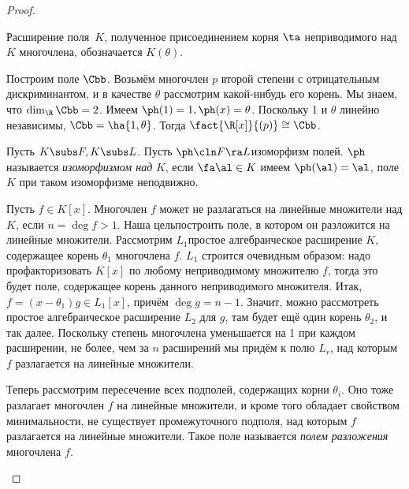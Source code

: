 \documentclass[a4paper]{article}
\begin{document}
\begin{proof}
\begin{note}
Расширение поля~$K$, полученное присоединением корня $\ta$ неприводимого над $K$ многочлена, обозначается
$K(\theta)$.
\end{note}

\begin{ex}
Построим поле $\Cbb$. Возьмём многочлен $p$ второй степени с отрицательным  дискриминантом, и в качестве
$\theta$ рассмотрим какой-нибудь его корень. Мы знаем, что $\dim_\R \Cbb=2$. Имеем $\ph(1)=1, \ph(x)=\theta$.
Поскольку 1 и $\theta$ линейно независимы, $\Cbb = \ha{1,\theta}$. Тогда $\fact{\R[x]}{(p)} \cong \Cbb$.
\end{ex}

Пусть $K \subs F, K \subs L$. Пусть $\ph\cln F \ra L$\т изоморфизм полей.  $\ph$ называется \emph{изоморфизмом
над} $K$, если $\fa \al \in K$ имеем $\ph(\al)=\al$,  поле $K$ при таком изоморфизме неподвижно.

Пусть $f \in K[x]$. Многочлен $f$ может не разлагаться на линейные множители  над $K$, если $n=\deg f > 1$.
Наша цель\т построить поле, в котором он разложится на линейные множители. Рассмотрим $L_1$\т простое
алгебраическое расширение $K$, содержащее корень $\theta_1$ многочлена $f$. $L_1$ строится очевидным образом:
надо профакторизовать $K[x]$ по любому неприводимому множителю $f$, тогда это будет поле, содержащее корень
данного неприводимого множителя. Итак, $f=(x-\theta_1)g \in L_1[x]$, причём $\deg g = n - 1$. Значит, можно
рассмотреть простое алгебраическое расширение $L_2$ для $g$, там будет ещё один корень $\theta_2$, и так
далее. Поскольку степень многочлена уменьшается на 1 при каждом расширении, не более, чем за $n$ расширений
мы придём к полю $L_r$, над которым $f$ разлагается на линейные множители.

\begin{df}
Теперь рассмотрим пересечение всех подполей, содержащих корни $\theta_i$.  Оно тоже разлагает многочлен $f$
на линейные множители, и кроме того обладает свойством минимальности,  не существует промежуточного
подполя, над которым $f$ разлагается на линейные множители. Такое поле называется \emph{полем разложения} многочлена $f$.
\end{df}


\end{proof}
\end{document}

